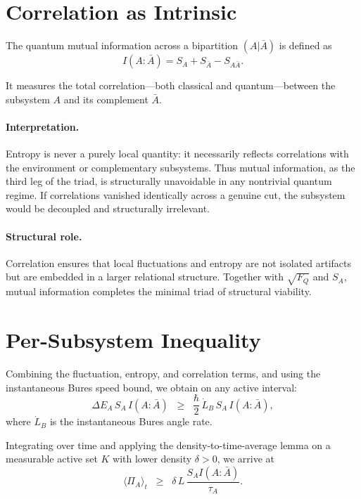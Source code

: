 \documentclass[10pt]{article}
\begin{document}
\section{Correlation as Intrinsic}

The quantum mutual information across a bipartition $(A|\bar{A})$ is defined as
\begin{equation}
I(A:\bar{A}) = S_A + S_{\bar{A}} - S_{A\bar{A}}.
\end{equation}

It measures the total correlation—both classical and quantum—between the subsystem $A$ and its
complement $\bar{A}$.

\paragraph{Interpretation.}
Entropy is never a purely local quantity: it necessarily reflects correlations with the environment or
complementary subsystems. Thus mutual information, as the third leg of the triad, is structurally
unavoidable in any nontrivial quantum regime. If correlations vanished identically across a genuine cut,
the subsystem would be decoupled and structurally irrelevant.

\paragraph{Structural role.}
Correlation ensures that local fluctuations and entropy are not isolated artifacts but are embedded
in a larger relational structure. Together with $\sqrt{F_Q}$ and $S_A$, mutual information completes
the minimal triad of structural viability.
\section{Per-Subsystem Inequality}

Combining the fluctuation, entropy, and correlation terms, and using the instantaneous Bures
speed bound, we obtain on any active interval:
\begin{equation}
\Delta E_A \, S_A \, I(A:\bar{A}) \;\;\geq\;\; \frac{\hbar}{2} \, \dot{L}_B \, S_A \, I(A:\bar{A}),
\end{equation}
where $\dot{L}_B$ is the instantaneous Bures angle rate.

Integrating over time and applying the density-to-time-average lemma on a measurable active set $K$
with lower density $\delta > 0$, we arrive at
\begin{equation}
\langle \Pi_A \rangle_t \;\;\geq\;\; \delta \, L \, \frac{S_A I(A:\bar{A})}{\tau_A}.
\end{equation}
\end{document}
